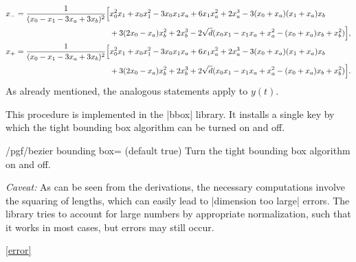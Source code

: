 \begin{subequations}
\begin{align}
    x_- &=
    \!\begin{aligned}[t]
        \frac{1}{(x_0 - x_1 - 3x_a + 3x_b)^2}
        \Bigl[
            & x_0^2x_1 + x_0x_1^2 - 3x_0x_1x_a + 6x_1x_a^2
              + 2x_a^3 - 3(x_0 + x_a)(x_1 + x_a)x_b \\
            & + 3(2x_0 - x_a)x_b^2 + 2x_b^3
              - 2\sqrt{d}(x_0x_1 - x_1x_a + x_a^2 - (x_0 + x_a)x_b + x_b^2)
        \Bigr],
    \end{aligned} \\
    x_+ &=
    \!\begin{aligned}[t]
        \frac{1}{(x_0 - x_1 - 3x_a + 3x_b)^2}
        \Bigl[
            & x_0^2x_1 + x_0x_1^2 - 3x_0x_1x_a + 6x_1x_a^2
              + 2x_a^3 - 3(x_0 + x_a)(x_1 + x_a)x_b \\
            & + 3(2x_0 - x_a)x_b^2 + 2x_b^3
              + 2\sqrt{d}(x_0x_1 - x_1x_a + x_a^2 - (x_0 + x_a)x_b + x_b^2)
        \Bigr].
    \end{aligned}
\end{align}
\end{subequations}
As already mentioned, the analogous
statements apply to $y(t)$.

This procedure is implemented in the |bbox| library.  It installs a single key
by which the tight bounding box algorithm can be turned on and off.

\begin{key}{/pgf/bezier bounding box= (default true)}
    Turn the tight bounding box algorithm on and off.

    \emph{Caveat:} As can be seen from the derivations, the necessary
    computations involve the squaring of lengths, which can easily lead to
    |dimension too large| errors.  The library tries to account for large
    numbers by appropriate normalization, such that it works in most cases, but
    errors may still occur.
\end{key}

\ref{error}
\begin{codeexample}[]
\end{codeexample}



